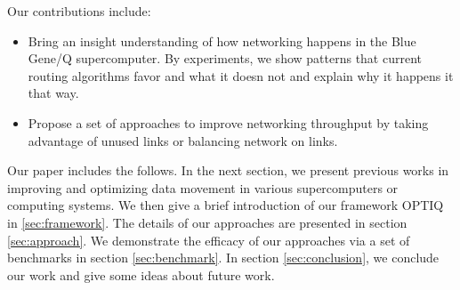 Our contributions include:
\begin{itemize}
\item Bring an insight understanding of how networking happens in the Blue Gene/Q supercomputer. By experiments, we show patterns that current routing algorithms favor and what it doesn not and explain why it happens it that way.
\item Propose a set of approaches to improve networking throughput by taking advantage of unused links or balancing network on links.
\end{itemize}

Our paper includes the follows. In the next section, we present previous works in improving and optimizing data movement in various supercomputers or computing systems. We then give a brief introduction of our framework OPTIQ in \ref{sec:framework}. The details of our approaches are presented in section \ref{sec:approach}. We demonstrate the efficacy of our approaches via a set of benchmarks in section \ref{sec:benchmark}. In section \ref{sec:conclusion}, we conclude our work and give some ideas about future work.
